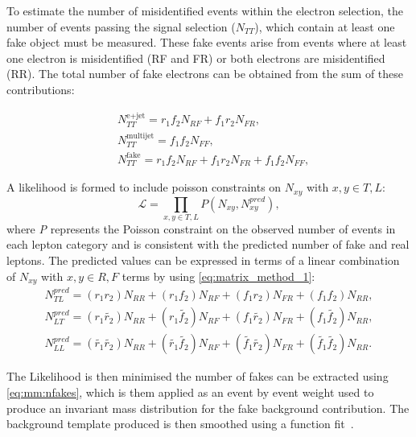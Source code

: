 To estimate the number of misidentified events within the electron selection, the number of events passing the signal selection ($N_{TT}$), which contain at least one fake object must be measured. These fake events arise from events where at least one electron is misidentified (RF and FR) or both electrons are misidentified (RR). The total number of fake electrons can be obtained from the sum of these contributions:

\begin{equation}
    \begin{aligned}\label{eq:mm:nfakes}
    & N^{\text{e+jet}}_{TT}=r_1f_2N_{RF}+f_1r_2N_{FR} ,\\ 
    & N^{\text{multijet}}_{TT}=f_1f_2N_{FF} ,\\ 
    & N^{\text{fake}}_{TT}=r_1f_2N_{RF}+f_1r_2N_{FR}+f_1f_2N_{FF} ,
    \end{aligned}
\end{equation}

A likelihood is formed to include poisson constraints on $N_{xy}$ with $x,y \in T,L$:
\begin{equation}
    \mathcal{L} = \prod_{x,y \in T,L} P(N_{xy},N_{xy}^{pred}), 
\end{equation}
where \emph{P} represents the Poisson constraint on the observed number of events in each lepton category and is consistent with the predicted number of fake and real leptons. The predicted values can be expressed in terms of a linear combination of $N_{xy}$ with $x,y \in R,F$ terms by using \cref{eq:matrix_method_1}:
\begin{equation}
    \begin{aligned}
    N_{TL}^{pred} = (r_1r_2)N_{RR} + (r_1f_2)N_{RF} + (f_1r_2)N_{FR} + (f_1f_2)N_{RR},  \\
    N_{LT}^{pred} = (r_1\tilde{r_2})N_{RR} + (r_1\tilde{f_2})N_{RF} + (f_1\tilde{r_2})N_{FR} + (f_1\tilde{f_2})N_{RR}, \\
    N_{LL}^{pred} = (\tilde{r_1}\tilde{r_2})N_{RR} + (\tilde{r_1}\tilde{f_2})N_{RF} + (\tilde{f_1}\tilde{r_2})N_{FR} + (\tilde{f_1}\tilde{f_2})N_{RR}.
    \end{aligned}
\end{equation}

The Likelihood is then minimised the number of fakes can be extracted using \cref{eq:mm:nfakes}, which is them applied as an event by event weight used to produce an invariant mass distribution for the fake background contribution. The background template produced is then smoothed using a function fit~\cite{EXOT-2016-05}. 

